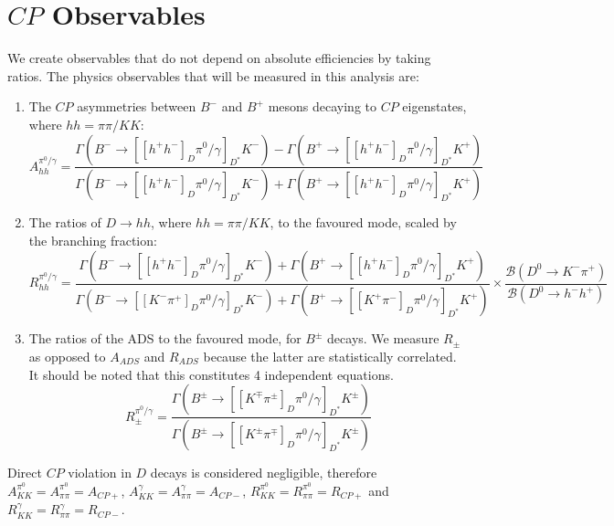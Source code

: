 \documentclass[oneside,12pt]{article}
\begin{document}
\section{\normalsize $CP$ Observables}
We create observables that do not depend on absolute efficiencies by taking
ratios. The physics observables that will be measured in this analysis are:

\begin{enumerate}
	\item The $CP$ asymmetries between $B^{-}$ and $B^{+}$ mesons decaying to $CP$
eigenstates, where $hh=\pi \pi /KK$:
		\begin{equation}
			A_{hh}^{\pi^{0}/\gamma}=\frac{\Gamma(B^{-}\rightarrow
			[[h^{+}h^{-}]_{D}\pi^{0}/\gamma]_{D^{*}}K^{-})-\Gamma(B^{+}\rightarrow
			[[h^{+}h^{-}]_{D}\pi^{0}/\gamma]_{D^{*}}K^{+})}{\Gamma(B^{-}\rightarrow
			[[h^{+}h^{-}]_{D}\pi^{0}/\gamma]_{D^{*}}K^{-})+\Gamma(B^{+}\rightarrow
			[[h^{+}h^{-}]_{D}\pi^{0}/\gamma]_{D^{*}}K^{+})} \label{eq:Aglw}
		\end{equation}
	\item The ratios of $D\rightarrow hh$, where $hh=\pi \pi /KK$, to the favoured mode,
scaled by the branching fraction:
		\begin{equation}
			R_{hh}^{\pi^{0}/\gamma}=\frac{\Gamma(B^{-}\rightarrow
			[[h^{+}h^{-}]_{D}\pi^{0}/\gamma]_{D^{*}}K^{-})+\Gamma(B^{+}\rightarrow
			[[h^{+}h^{-}]_{D}\pi^{0}/\gamma]_{D^{*}}K^{+})}{\Gamma(B^{-}\rightarrow
			[[K^{-}\pi^{+}]_{D}\pi^{0}/\gamma]_{D^{*}}K^{-})+\Gamma(B^{+}\rightarrow
			[[K^{+}\pi^{-}]_{D}\pi^{0}/\gamma]_{D^{*}}K^{+})} \times
			\frac{\mathcal{B}(D^{0}\rightarrow
			K^{-}\pi^{+})}{\mathcal{B}(D^{0}\rightarrow h^{-}h^{+})} \label{eq:Rglw}
		\end{equation}
	\item The ratios of the ADS to the favoured mode, for $B^{\pm}$ decays. We
measure $R_{\pm}$ as opposed to $A_{ADS}$ and $R_{ADS}$ because the latter are
statistically correlated. It should be noted that this constitutes 4 independent equations.
		\begin{equation}
			R_{\pm}^{\pi^{0}/\gamma}=\frac{\Gamma(B^{\pm}\rightarrow
			[[K^{\mp}\pi^{\pm}]_{D}\pi^{0}/\gamma]_{D^{*}}K^{\pm})}{\Gamma(B^{\pm}\rightarrow
			[[K^{\pm}\pi^{\mp}]_{D}\pi^{0}/\gamma]_{D^{*}}K^{\pm})} \label{eq:Rads}
		\end{equation}
\end{enumerate}
\noindent Direct $CP$ violation in $D$ decays is considered negligible, therefore
$A_{KK}^{\pi^{0}}=A_{\pi\pi}^{\pi^{0}}=A_{CP+}$,
$A_{KK}^{\gamma}=A_{\pi\pi}^{\gamma}=A_{CP-}$,
$R_{KK}^{\pi^{0}}=R_{\pi\pi}^{\pi^{0}}=R_{CP+}$ and
$R_{KK}^{\gamma}=R_{\pi\pi}^{\gamma}=R_{CP-}$.
\end{document}

